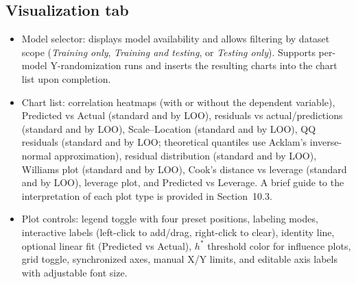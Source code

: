 \documentclass[11pt,a4paper]{article}
\begin{document}
\subsection{\textbf{Visualization} tab}
\begin{itemize}
  \item Model selector: displays model availability and allows filtering by dataset scope (\emph{Training only}, \emph{Training and testing}, or \emph{Testing only}). Supports per-model Y-randomization runs and inserts the resulting charts into the chart list upon completion.
  \item Chart list: correlation heatmaps (with or without the dependent variable), Predicted vs Actual (standard and by LOO), residuals vs actual/predictions (standard and by LOO), Scale--Location (standard and by LOO), QQ residuals (standard and by LOO; theoretical quantiles use Acklam's inverse-normal approximation), residual distribution (standard and by LOO), Williams plot (standard and by LOO), Cook's distance vs leverage (standard and by LOO), leverage plot, and Predicted vs Leverage. A brief guide to the interpretation of each plot type is provided in Section~10.3.
  \item Plot controls: legend toggle with four preset positions, labeling modes, interactive labels (left-click to add/drag, right-click to clear), identity line, optional linear fit (Predicted vs Actual), $h^*$ threshold color for influence plots, grid toggle, synchronized axes, manual X/Y limits, and editable axis labels with adjustable font size.
\end{itemize}
\end{document}
